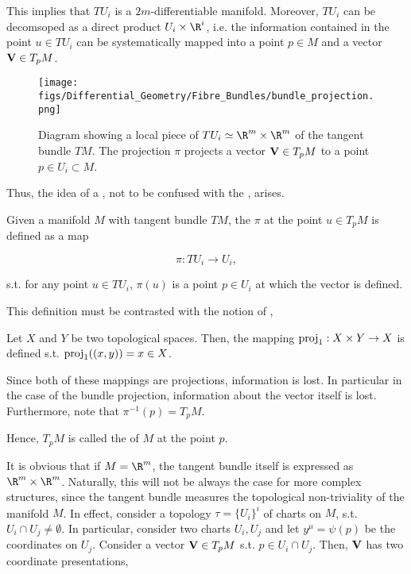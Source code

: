 This implies that $TU_i$ is a $2m$-differentiable manifold. 
Moreover, $TU_i$ can be decomsoped as a direct product $U_i \times \R^i$, i.e. the information contained in the point $u \in TU_i$ can be systematically mapped into a point $p \in M$ and a vector ${\bf V} \in T_p M$. \medbreak

\begin{wrapfigure}{l}{0.3\textwidth}
\texttt{[image: figs/Differential\_Geometry/Fibre\_Bundles/bundle\_projection.png]}
\caption{Diagram showing a local piece of $TU_i \simeq \R^m \times \R^m$ of the tangent bundle $TM$. The projection $\pi$ projects a vector ${\bf V} \in T_p M$ to a point $p \in U_i \subset M$.}
\end{wrapfigure} 

Thus, the idea of a , not to be confused with the , arises. 

\begin{df}
    Given a manifold $M$ with tangent bundle $TM$, the  $\pi$ at the point $u \in T_pM$ is defined as a map

    $$
        \pi: TU_i \rightarrow U_i, 
    $$

    s.t. for any point $u \in TU_i$, $\pi(u)$ is a point $p \in U_i$ at which the vector is defined. 
\end{df}

This definition must be contrasted with the notion of ,

\begin{df}
    Let $X$ and $Y$ be two topological spaces. Then, the  mapping $\textnormal{proj}_1: X \times Y \rightarrow X$ is defined s.t. $\textnormal{proj}_1( (x,y) ) = x \in X$.
\end{df}

\clearpage

\begin{remark}
Since both of these mappings are projections, information is lost. In particular in the case of the bundle projection, information about the vector itself is lost. 
Furthermore, note that $\pi^{-1}(p) = T_p M$. 

\end{remark}

Hence, $T_pM$ is called the  of $M$ at the point $p$. \medbreak

It is obvious that if $M = \R^m$, the tangent bundle itself is expressed as $\R^m \times \R^m$. Naturally, this will not be always the case for more complex structures, since the tangent bundle measures the topological non-triviality of the manifold $M$. 
In effect, consider a topology $\tau = \{U_i\}^{i}$ of charts on $M$, s.t. $U_i \cap U_j \neq \emptyset$. In particular, consider two charts $U_i, U_j$ and let $y^{\mu} = \psi(p)$ be the coordinates on $U_j$. Consider a vector ${\bf V} \in T_pM$ s.t. $p \in U_i \cap U_j$. Then, ${\bf V}$ has two coordinate presentations,

